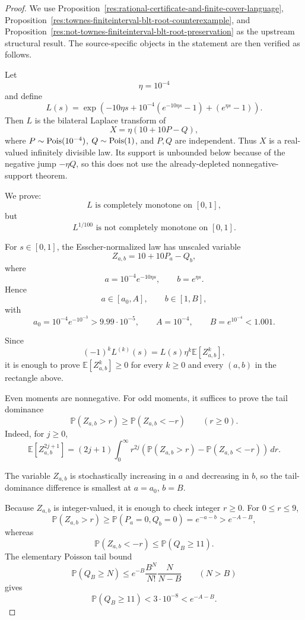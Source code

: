 \documentclass[11pt]{article}
\numberwithin{equation}{section}
\theoremstyle{definition}
\theoremstyle{remark}
\newcommand{\1}{\mathbf 1}
\begin{document}
\begin{proof}
We use Proposition~\ref{res:rational-certificate-and-finite-cover-language}, Proposition~\ref{res:townes-finiteinterval-blt-root-counterexample}, and Proposition~\ref{res:not-townes-finiteinterval-blt-root-preservation} as the upstream structural result. The source-specific objects in the statement are then verified as follows.

Let
\[
\eta=10^{-4}
\]
and define
\[
L(s)=\exp\left(
-10\eta s+10^{-4}\left(e^{-10\eta s}-1\right)+\left(e^{\eta s}-1\right)
\right).
\]
Then \(L\) is the bilateral Laplace transform of
\[
X=\eta(10+10P-Q),
\]
where \(P\sim {\rm Pois}(10^{-4})\), \(Q\sim{\rm Pois}(1)\), and \(P,Q\) are independent. Thus \(X\) is a real-valued infinitely divisible law. Its support is unbounded below because of the negative jump \(-\eta Q\), so this does not use the already-depleted nonnegative-support theorem.

We prove:
\[
L\text{ is completely monotone on }[0,1],
\]
but
\[
L^{1/100}\text{ is not completely monotone on }[0,1].
\]

For \(s\in[0,1]\), the Esscher-normalized law has unscaled variable
\[
Z_{a,b}=10+10P_a-Q_b,
\]
where
\[
a=10^{-4}e^{-10\eta s},\qquad b=e^{\eta s}.
\]
Hence
\[
a\in[a_0,A],\qquad b\in[1,B],
\]
with
\[
a_0=10^{-4}e^{-10^{-3}}>9.99\cdot10^{-5},\qquad
A=10^{-4},\qquad B=e^{10^{-4}}<1.001.
\]

Since
\[
(-1)^kL^{(k)}(s)=L(s)\eta^k\mathbb E[Z_{a,b}^k],
\]
it is enough to prove \(\mathbb E[Z_{a,b}^k]\ge0\) for every \(k\ge0\) and every \((a,b)\) in the rectangle above.

Even moments are nonnegative. For odd moments, it suffices to prove the tail dominance
\[
\mathbb P(Z_{a,b}>r)\ge \mathbb P(Z_{a,b}<-r)
\qquad(r\ge0).
\]
Indeed, for \(j\ge0\),
\[
\mathbb E[Z_{a,b}^{2j+1}]
=(2j+1)\int_0^\infty r^{2j}
\left(\mathbb P(Z_{a,b}>r)-\mathbb P(Z_{a,b}<-r)\right)\,dr.
\]

The variable \(Z_{a,b}\) is stochastically increasing in \(a\) and decreasing in \(b\), so the tail-dominance difference is smallest at \(a=a_0\), \(b=B\).

Because \(Z_{a,b}\) is integer-valued, it is enough to check integer \(r\ge0\). For \(0\le r\le9\),
\[
\mathbb P(Z_{a,b}>r)\ge \mathbb P(P_a=0,Q_b=0)=e^{-a-b}>e^{-A-B},
\]
whereas
\[
\mathbb P(Z_{a,b}<-r)\le\mathbb P(Q_B\ge11).
\]
The elementary Poisson tail bound
\[
\mathbb P(Q_B\ge N)
\le e^{-B}\frac{B^N}{N!}\frac{N}{N-B}
\qquad(N>B)
\]
gives
\[
\mathbb P(Q_B\ge11)<3\cdot10^{-8}<e^{-A-B}.
\]


\end{proof}
\end{document}
